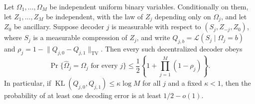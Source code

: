 Let \(\Omega_1,\ldots,\Omega_M\) be independent uniform binary variables.  Conditionally on them, let \(Z_1,\ldots,Z_M\) be independent, with the law of \(Z_j\) depending only on \(\Omega_j\), and let \(Z_0\) be ancillary.  Suppose decoder \(j\) is measurable with respect to \((S_j,Z_{-j},Z_0)\), where \(S_j\) is a measurable compression of \(Z_j\), and write \(Q_{j,b}=\mathcal L(S_j\mid\Omega_j=b)\) and \(\rho_j=1-\lVert Q_{j,0}-Q_{j,1}\rVert_{\mathrm{TV}}\).  Then every such decentralized decoder obeys
\[
\Pr\{\widehat\Omega_j=\Omega_j\text{ for every }j\}
\leq\frac12\left\{1+\prod_{j=1}^M(1-\rho_j)\right\}.
\]
In particular, if \(\operatorname{KL}(Q_{j,0},Q_{j,1})\leq\kappa\log M\) for all \(j\) and a fixed \(\kappa<1\), then the probability of at least one decoding error is at least \(1/2-o(1)\).